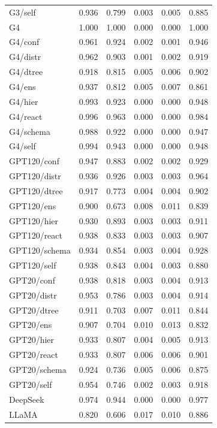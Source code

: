 \begin{table}[t]
\begin{tabular}{lrrrrr}
G3/self & 0.936 & 0.799 & 0.003 & 0.005 & 0.885 \\
G4 & 1.000 & 1.000 & 0.000 & 0.000 & 1.000 \\
G4/conf & 0.961 & 0.924 & 0.002 & 0.001 & 0.946 \\
G4/distr & 0.962 & 0.903 & 0.001 & 0.002 & 0.919 \\
G4/dtree & 0.918 & 0.815 & 0.005 & 0.006 & 0.902 \\
G4/ens & 0.937 & 0.812 & 0.005 & 0.007 & 0.861 \\
G4/hier & 0.993 & 0.923 & 0.000 & 0.000 & 0.948 \\
G4/react & 0.996 & 0.963 & 0.000 & 0.000 & 0.984 \\
G4/schema & 0.988 & 0.922 & 0.000 & 0.000 & 0.947 \\
G4/self & 0.994 & 0.943 & 0.000 & 0.000 & 0.948 \\
GPT120/conf & 0.947 & 0.883 & 0.002 & 0.002 & 0.929 \\
GPT120/distr & 0.936 & 0.926 & 0.003 & 0.003 & 0.964 \\
GPT120/dtree & 0.917 & 0.773 & 0.004 & 0.004 & 0.902 \\
GPT120/ens & 0.900 & 0.673 & 0.008 & 0.011 & 0.839 \\
GPT120/hier & 0.930 & 0.893 & 0.003 & 0.003 & 0.911 \\
GPT120/react & 0.938 & 0.833 & 0.003 & 0.003 & 0.907 \\
GPT120/schema & 0.934 & 0.854 & 0.003 & 0.004 & 0.928 \\
GPT120/self & 0.938 & 0.843 & 0.004 & 0.003 & 0.880 \\
GPT20/conf & 0.938 & 0.818 & 0.003 & 0.004 & 0.913 \\
GPT20/distr & 0.953 & 0.786 & 0.003 & 0.004 & 0.914 \\
GPT20/dtree & 0.911 & 0.703 & 0.007 & 0.011 & 0.844 \\
GPT20/ens & 0.907 & 0.704 & 0.010 & 0.013 & 0.832 \\
GPT20/hier & 0.933 & 0.807 & 0.004 & 0.005 & 0.913 \\
GPT20/react & 0.933 & 0.807 & 0.006 & 0.006 & 0.901 \\
GPT20/schema & 0.924 & 0.736 & 0.005 & 0.006 & 0.875 \\
GPT20/self & 0.954 & 0.746 & 0.002 & 0.003 & 0.918 \\
\midrule
DeepSeek & 0.974 & 0.944 & 0.000 & 0.000 & 0.977 \\
LLaMA & 0.820 & 0.606 & 0.017 & 0.010 & 0.886 \\

\end{tabular}
\end{table}
